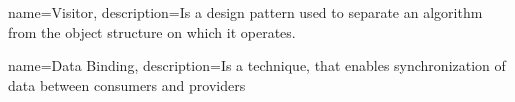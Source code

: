 

\makeglossaries

{
    name=Visitor,
    description={Is a design pattern used to separate an algorithm from the object structure on which it operates.}
}

{
    name=Data Binding,
    description={Is a technique, that enables synchronization of data between consumers and providers}
}






